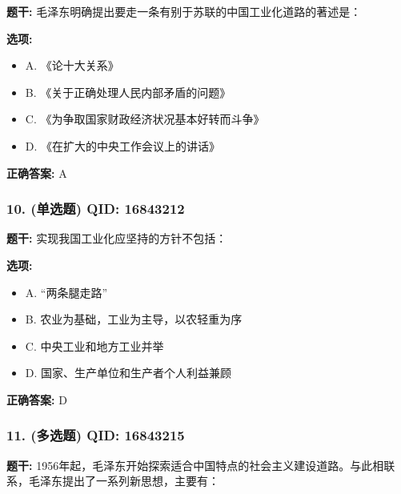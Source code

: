 \documentclass[12pt,UTF8]{ctexart}
\begin{document}
\textbf{题干:}
毛泽东明确提出要走一条有别于苏联的中国工业化道路的著述是：

\textbf{选项:}
\begin{itemize}[leftmargin=*]

  \item A. 《论十大关系》

  \item B. 《关于正确处理人民内部矛盾的问题》

  \item C. 《为争取国家财政经济状况基本好转而斗争》

  \item D. 《在扩大的中央工作会议上的讲话》

\end{itemize}

\textbf{正确答案:}
A

\vspace{0.3em}\hrulefill\vspace{0.7em}

\subsubsection*{10. (单选题) \small QID: 16843212}

\textbf{题干:}
实现我国工业化应坚持的方针不包括：

\textbf{选项:}
\begin{itemize}[leftmargin=*]

  \item A. “两条腿走路”

  \item B. 农业为基础，工业为主导，以农轻重为序

  \item C. 中央工业和地方工业并举

  \item D. 国家、生产单位和生产者个人利益兼顾

\end{itemize}

\textbf{正确答案:}
D

\vspace{0.3em}\hrulefill\vspace{0.7em}

\subsubsection*{11. (多选题) \small QID: 16843215}

\textbf{题干:}
1956年起，毛泽东开始探索适合中国特点的社会主义建设道路。与此相联系，毛泽东提出了一系列新思想，主要有：
\end{document}
